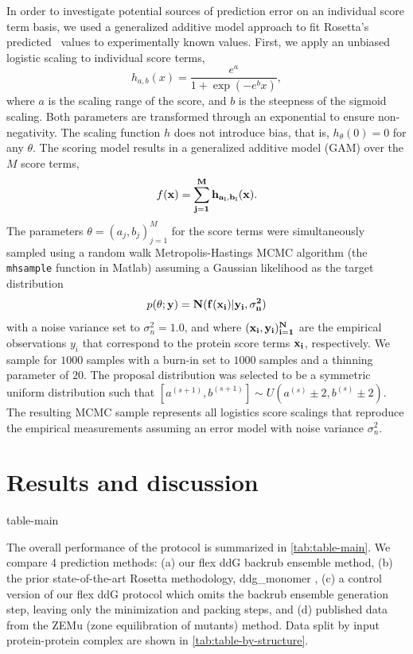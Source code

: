 In order to investigate potential sources of prediction error on an individual score term basis, we used a generalized additive model\cite{hastie_generalized_1990} approach to fit Rosetta's predicted \ddg\ values to experimentally known values.
First, we apply an unbiased logistic scaling to individual score terms,
$$h_{a,b}(x) = \frac{e^{a}}{1 + \exp(- e^{b} x)},$$
where $a$ is the scaling range of the score, and $b$ is the steepness of the sigmoid scaling. Both parameters are transformed through an exponential to ensure non-negativity. The scaling function $h$ does not introduce bias, that is, $h_\theta(0) = 0$ for any $\theta$. The scoring model results in a generalized additive model (GAM) over the $M$ score terms,
$$f(\bf{x}) = \sum_{j=1}^M h_{a_i,b_i}(x).$$
The parameters $\theta = (a_j,b_j)_{j=1}^M$ for the score terms were simultaneously sampled using a random walk Metropolis-Hastings MCMC algorithm (the \texttt{mhsample} function in Matlab) assuming a Gaussian likelihood as the target distribution
$$p(\theta ; \bf{y}) = N( f(\bf{x}_i) | y_i, \sigma_n^2)$$
with a noise variance set to $\sigma_n^2 = 1.0$, and where $(\bf{x}_i,y_i)_{i=1}^N$ are the empirical observations $y_i$ that correspond to the protein score terms $\bf{x}_i$, respectively. We sample for $1000$ samples with a burn-in set to $1000$ samples and a thinning parameter of $20$. The proposal distribution was selected to be a symmetric uniform distribution such that $[a^{(s+1)},b^{(s+1)}] \sim U( a^{(s)} \pm 2, b^{(s)} \pm 2)$. The resulting MCMC sample represents all logistics score scalings that reproduce the empirical measurements assuming an error model with noise variance $\sigma_n^2$.

\section{Results and discussion}

{table-main}

The overall performance of the protocol is summarized in \cref{tab:table-main}.
We compare 4 prediction methods: (a) our flex ddG backrub ensemble method, (b) the prior state-of-the-art Rosetta methodology, ddg\_monomer \cite{kellogg_role_2011}, (c) a control version of our flex ddG protocol which omits the backrub ensemble generation step, leaving only the minimization and packing steps, and (d) published data from the ZEMu (zone equilibration of mutants) method\cite{dourado_multiscale_2014}. Data split by input protein-protein complex are shown in \cref{tab:table-by-structure}.

